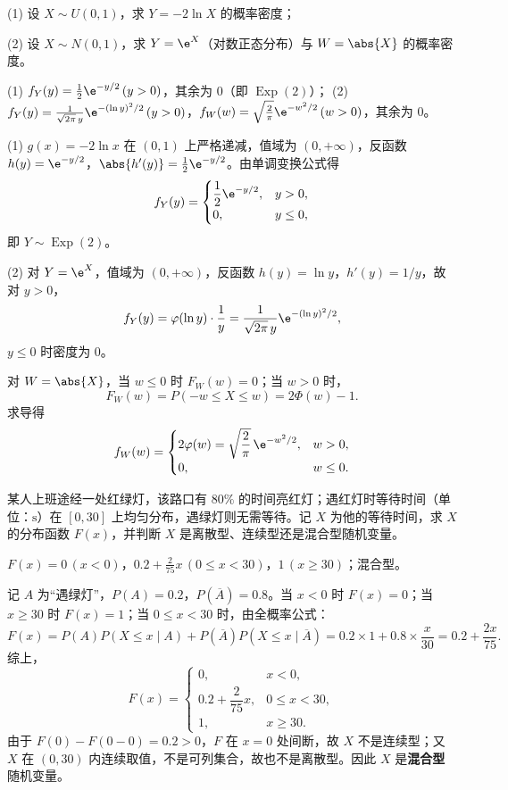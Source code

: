 \begin{exercise}[title={单调与非单调连续函数变换},level=standard,points=10,tags={随机变量函数}]
(1) 设 $X\sim U(0,1)$，求 $Y=-2\ln X$ 的概率密度；

(2) 设 $X\sim N(0,1)$，求 $Y=\e^X$（对数正态分布）与 $W=\abs{X}$ 的概率密度。
\begin{answer}
(1) $f_Y(y)=\frac{1}{2}\e^{-y/2}\,(y>0)$，其余为 $0$（即 $\operatorname{Exp}(2)$）；
(2) $f_Y(y)=\frac{1}{\sqrt{2\pi}\,y}\e^{-(\ln y)^2/2}\,(y>0)$，$f_W(w)=\sqrt{\frac{2}{\pi}}\e^{-w^2/2}\,(w>0)$，其余为 $0$。
\end{answer}
\begin{solution}
(1) $g(x)=-2\ln x$ 在 $(0,1)$ 上严格递减，值域为 $(0,+\infty)$，反函数 $h(y)=\e^{-y/2}$，$\abs{h'(y)}=\frac{1}{2}\e^{-y/2}$。由单调变换公式得
\[
  f_Y(y)=
  \begin{cases}
    \dfrac{1}{2}\e^{-y/2},& y>0,\\
    0,& y\le 0,
  \end{cases}
\]
即 $Y\sim\operatorname{Exp}(2)$。

(2) 对 $Y=\e^X$，值域为 $(0,+\infty)$，反函数 $h(y)=\ln y$，$h'(y)=1/y$，故对 $y>0$，
\[
  f_Y(y)=\varphi(\ln y)\cdot\frac{1}{y}=\frac{1}{\sqrt{2\pi}\,y}\e^{-(\ln y)^2/2},
\]
$y\le 0$ 时密度为 $0$。

对 $W=\abs{X}$，当 $w\le 0$ 时 $F_W(w)=0$；当 $w>0$ 时，
\[
  F_W(w)=P(-w\le X\le w)=2\Phi(w)-1.
\]
求导得
\[
  f_W(w)=
  \begin{cases}
    2\varphi(w)=\sqrt{\dfrac{2}{\pi}}\,\e^{-w^2/2},& w>0,\\
    0,& w\le 0.
  \end{cases}
\]
\end{solution}
\end{exercise}

\begin{exercise}[title={混合型随机变量的判别},level=advanced,points=8,tags={分布函数,混合分布}]
某人上班途经一处红绿灯，该路口有 $80\%$ 的时间亮红灯；遇红灯时等待时间（单位：$\mathrm{s}$）在 $[0,30]$ 上均匀分布，遇绿灯则无需等待。记 $X$ 为他的等待时间，求 $X$ 的分布函数 $F(x)$，并判断 $X$ 是离散型、连续型还是混合型随机变量。
\begin{answer}
$F(x)=0\,(x<0)$，$0.2+\frac{2}{75}x\,(0\le x<30)$，$1\,(x\ge 30)$；混合型。
\end{answer}
\begin{solution}
记 $A$ 为“遇绿灯”，$P(A)=0.2$，$P(\overline{A})=0.8$。当 $x<0$ 时 $F(x)=0$；当 $x\ge 30$ 时 $F(x)=1$；当 $0\le x<30$ 时，由全概率公式：
\[
  F(x)=P(A)P(X\le x\mid A)+P(\overline{A})P(X\le x\mid\overline{A})
  =0.2\times 1+0.8\times\frac{x}{30}=0.2+\frac{2x}{75}.
\]
综上，
\[
  F(x)=
  \begin{cases}
    0,& x<0,\\
    0.2+\dfrac{2}{75}x,& 0\le x<30,\\
    1,& x\ge 30.
  \end{cases}
\]
由于 $F(0)-F(0-0)=0.2>0$，$F$ 在 $x=0$ 处间断，故 $X$ 不是连续型；又 $X$ 在 $(0,30)$ 内连续取值，不是可列集合，故也不是离散型。因此 $X$ 是\textbf{混合型}随机变量。
\end{solution}
\end{exercise}

